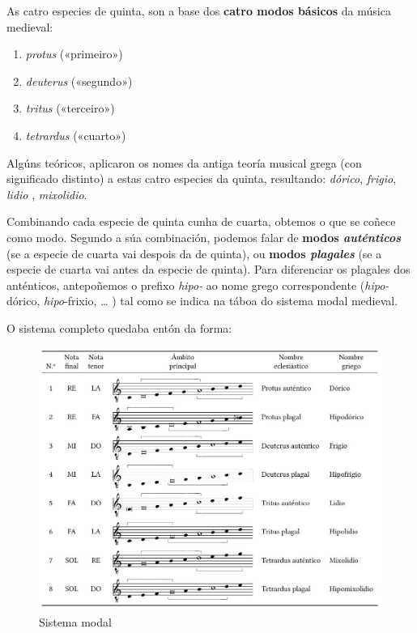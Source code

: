 \documentclass[a4paper, twoside]{templates/ociamthesis}
\providecommand{\tightlist}{%
  \setlength{\itemsep}{0pt}\setlength{\parskip}{0pt}}
\begin{document}
As catro especies de quinta, son a base dos \textbf{catro modos básicos} da música medieval:

\begin{enumerate}
\def\labelenumi{\arabic{enumi}.}
\tightlist
\item
  \emph{protus} («primeiro»)
\item
  \emph{deuterus} («segundo»)
\item
  \emph{tritus} («terceiro»)
\item
  \emph{tetrardus} («cuarto»)
\end{enumerate}

Algúns teóricos, aplicaron os nomes da antiga teoría musical grega (con significado distinto) a estas catro especies da quinta, resultando: \emph{dórico}, \emph{frigio}, \emph{lidio} , \emph{mixolidio}.

Combinando cada especie de quinta cunha de cuarta, obtemos o que se coñece como modo. Segundo a súa combinación, podemos falar de \textbf{modos \emph{auténticos}} (se a especie de cuarta vai despois da de quinta), ou \textbf{modos \emph{plagales}} (se a especie de cuarta vai antes da especie de quinta). Para diferenciar os plagales dos anténticos, antepoñemos o prefixo \emph{hipo-} ao nome grego correspondente (\emph{hipo-}dórico, \emph{hipo}-frixio, \ldots{} ) tal como se indica na táboa do sistema modal medieval.

O sistema completo quedaba entón da forma:

\begin{figure}
\centering
\includegraphics{figures/ud-03/sistema-modal.jpg}
\caption{Sistema modal}
\end{figure}
\end{document}
